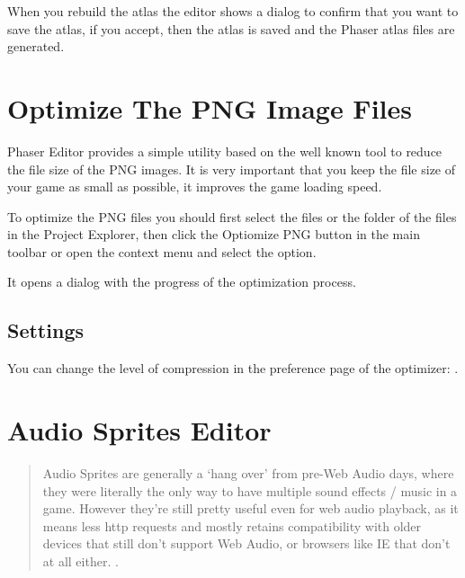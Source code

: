 \documentclass[letterpaper,10pt,english]{sphinxmanual}
\begin{document}
When you rebuild the atlas the editor shows a dialog to confirm that you want to save the atlas, if you accept, then the atlas  is saved and the Phaser atlas files are generated.


\chapter{Optimize The PNG Image Files}
\label{\detokenize{optipng:optimize-the-png-image-files}}\label{\detokenize{optipng::doc}}
Phaser Editor provides a simple utility based on the well known  tool to reduce the file size of the PNG images. It is very important that you keep the file size of your game as small as possible, it improves the game loading speed.

To optimize the PNG files you should first select the files or the folder of the files in the Project Explorer, then click the Optiomize PNG button in the main toolbar or open the context menu and select the  option.

It opens a dialog with the progress of the optimization process.

\noindent{}

\noindent{}


\section{Settings}
\label{\detokenize{optipng:settings}}
You can change the level of compression in the preference page of the optimizer: .

\noindent{}


\chapter{Audio Sprites Editor}
\label{\detokenize{audio_sprites:audio-sprites-editor}}\label{\detokenize{audio_sprites::doc}}\begin{quote}

Audio Sprites are generally a ‘hang over’ from pre-Web Audio days, where they were literally the only way to have multiple sound effects / music in a game. However they’re still pretty useful even for web audio playback, as it means less http requests and mostly retains compatibility with older devices that still don’t support Web Audio, or browsers like IE that don’t at all either. \textendash{}  .
\end{quote}
\end{document}
